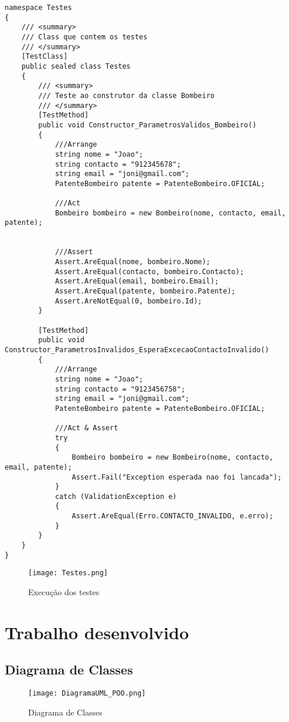 \documentclass[11pt]{scrartcl} %
\begin{document}
\begin{lstlisting}[language={[Sharp]C}, caption={Exemplo da utilização de testes}, label={Utilização de testes}]
namespace Testes
{
	/// <summary>
	/// Class que contem os testes
	/// </summary>
	[TestClass]
	public sealed class Testes
	{
		/// <summary>
		/// Teste ao construtor da classe Bombeiro
		/// </summary>
		[TestMethod]
		public void Constructor_ParametrosValidos_Bombeiro()
		{
			///Arrange
			string nome = "Joao";
			string contacto = "912345678";
			string email = "joni@gmail.com";
			PatenteBombeiro patente = PatenteBombeiro.OFICIAL;
			
			///Act
			Bombeiro bombeiro = new Bombeiro(nome, contacto, email, patente);
			
			
			///Assert
			Assert.AreEqual(nome, bombeiro.Nome);
			Assert.AreEqual(contacto, bombeiro.Contacto);
			Assert.AreEqual(email, bombeiro.Email);
			Assert.AreEqual(patente, bombeiro.Patente);
			Assert.AreNotEqual(0, bombeiro.Id);
		}
		
		[TestMethod]
		public void Constructor_ParametrosInvalidos_EsperaExcecaoContactoInvalido()
		{
			///Arrange
			string nome = "Joao";
			string contacto = "9123456758";
			string email = "joni@gmail.com";
			PatenteBombeiro patente = PatenteBombeiro.OFICIAL;
			
			///Act & Assert
			try
			{
				Bombeiro bombeiro = new Bombeiro(nome, contacto, email, patente);
				Assert.Fail("Exception esperada nao foi lancada");
			}
			catch (ValidationException e)
			{
				Assert.AreEqual(Erro.CONTACTO_INVALIDO, e.erro);
			}
		}
	}
}

\end{lstlisting}

	\begin{figure}[h] %
	\centering
	\texttt{[image: Testes.png]}
	\caption{Execução dos testes} %
	\end{figure}
\section{Trabalho desenvolvido}

\subsection{Diagrama de Classes}

\begin{figure}[h] %
	\centering
	\texttt{[image: DiagramaUML\_POO.png]}
	\caption{Diagrama de Classes} %
\end{figure}	
\end{document}
